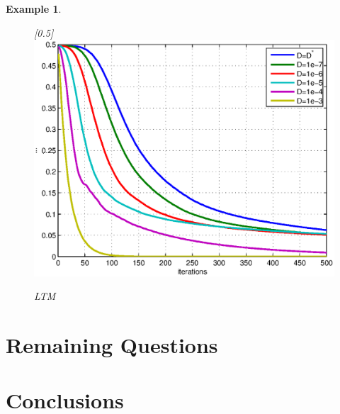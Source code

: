 \documentclass{article}
\newtheorem{example}{Example}
\begin{document}
\begin{example}
\begin{figure}
 \centerline{
  \scalebox{0.5}[0.5]{\includegraphics{ltmcutoff.eps}}
  } \caption{LTM}
  \label{democutoff2}
\end{figure}


\end{example}




\section{Remaining Questions}
\section{Conclusions}
\label{Conclusions}
\cite{Wiggins2004}
\cite{Ottino2004}
\cite{Mezic2005}
\cite{Thiffeault2003-13}
\cite{Thiffeault2003-309}
\cite{Thiffeault2004}
\cite{Thiffeault2005}
\cite{Ashwin2002}
\cite{Boyd2004}
\cite{Diaconis1996}
\cite{Diaconis2001}
\cite{Diaconis2005}
\cite{Diaconis1986}
\cite{Hammarstr2005}
\cite{Fereday2002}






\end{document}
